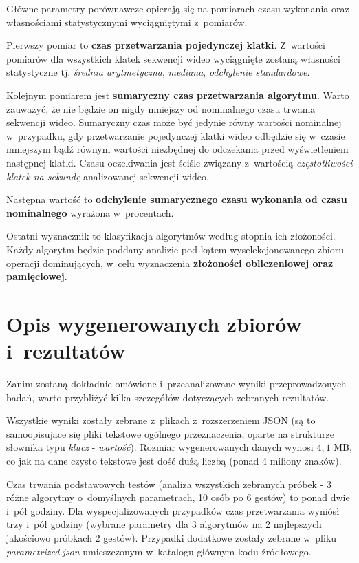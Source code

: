       Główne parametry porównawcze opierają się na pomiarach czasu wykonania oraz własnościami statystycznymi wyciągniętymi z~pomiarów.

      Pierwszy pomiar to \textbf{czas przetwarzania pojedynczej klatki}. Z~wartości pomiarów dla wszystkich klatek sekwencji wideo wyciągnięte zostaną własności statystyczne tj. \textit{średnia arytmetyczna}, \textit{mediana}, \textit{odchylenie standardowe}.

      Kolejnym pomiarem jest \textbf{sumaryczny czas przetwarzania algorytmu}. Warto zauważyć, że nie będzie on nigdy mniejszy od nominalnego czasu trwania sekwencji wideo. Sumaryczny czas może być jedynie równy wartości nominalnej w~przypadku, gdy przetwarzanie pojedynczej klatki wideo odbędzie się w~czasie mniejszym bądź równym wartości niezbędnej do odczekania przed wyświetleniem następnej klatki. Czasu oczekiwania jest ściśle związany z~wartością \textit{częstotliwości klatek na sekundę} analizowanej sekwencji wideo.

      Następna wartość to \textbf{odchylenie sumarycznego czasu wykonania od czasu nominalnego} wyrażona w~procentach.

      Ostatni wyznacznik to klasyfikacja algorytmów według stopnia ich złożoności. Każdy algorytm będzie poddany analizie pod kątem wyselekcjonowanego zbioru operacji dominujących, w~celu wyznaczenia \textbf{złożoności obliczeniowej oraz pamięciowej}.

  \section{Opis wygenerowanych zbiorów i~rezultatów}\label{Section_Results}
    Zanim zostaną dokładnie omówione i~przeanalizowane wyniki przeprowadzonych badań, warto przybliżyć kilka szczegółów dotyczących zebranych rezultatów.

    Wszystkie wyniki zostały zebrane z~plikach z~rozszerzeniem JSON (są to samoopisujace się pliki tekstowe ogólnego przeznaczenia, oparte na strukturze słownika typu \textit{klucz} - \textit{wartość}). Rozmiar wygenerowanych danych wynosi $4,1$ MB, co jak na dane czysto tekstowe jest dość dużą liczbą (ponad 4 miliony znaków).

    Czas trwania podstawowych testów (analiza wszystkich zebranych próbek - 3 różne algorytmy o~domyślnych parametrach, 10 osób po 6 gestów) to ponad dwie i~pół godziny. Dla wyspecjalizowanych przypadków czas przetwarzania wyniósł trzy i~pół godziny (wybrane parametry dla 3 algorytmów na 2 najlepszych jakościowo próbkach 2 gestów). Przypadki dodatkowe zostały zebrane w~pliku \textit{parametrized.json} umieszczonym w~katalogu głównym kodu źródłowego.

